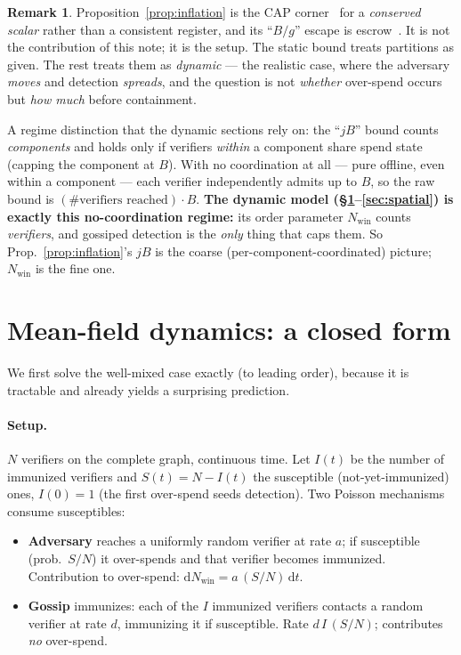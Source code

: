 \documentclass[11pt]{article}
\theoremstyle{plain}
\theoremstyle{definition}
\newtheorem{remark}{Remark}
\newcommand{\Nwin}{N_{\mathrm{win}}}
\begin{document}
\begin{remark}
Proposition~\ref{prop:inflation} is the CAP corner~\cite{GilbertLynch2002} for a
\emph{conserved scalar} rather than a consistent register, and its ``$B/g$''
escape is escrow~\cite{ONeil1986Escrow,Barbara1994Demarcation}. It is not the
contribution of this note; it is the setup. The static bound treats partitions as
given. The rest treats them as \emph{dynamic} --- the realistic case, where the
adversary \emph{moves} and detection \emph{spreads}, and the question is not
\emph{whether} over-spend occurs but \emph{how much} before containment.

A regime distinction that the dynamic sections rely on: the ``$jB$'' bound counts
\emph{components} and holds only if verifiers \emph{within} a component share spend
state (capping the component at $B$). With no coordination at all --- pure offline,
even within a component --- each verifier independently admits up to $B$, so the
raw bound is $(\#\text{verifiers reached})\cdot B$. \textbf{The dynamic model
(\S\ref{sec:meanfield}--\ref{sec:spatial}) is exactly this no-coordination regime:}
its order parameter $\Nwin$ counts \emph{verifiers}, and gossiped detection is the
\emph{only} thing that caps them. So Prop.~\ref{prop:inflation}'s $jB$ is the coarse
(per-component-coordinated) picture; $\Nwin$ is the fine one.
\end{remark}

\section{Mean-field dynamics: a closed form}\label{sec:meanfield}

We first solve the well-mixed case exactly (to leading order), because it is
tractable and already yields a surprising prediction.

\paragraph{Setup.} $N$ verifiers on the complete graph, continuous time. Let
$I(t)$ be the number of immunized verifiers and $S(t)=N-I(t)$ the susceptible
(not-yet-immunized) ones, $I(0)=1$ (the first over-spend seeds detection). Two
Poisson mechanisms consume susceptibles:
\begin{itemize}[leftmargin=1.4em,itemsep=1pt]
  \item \textbf{Adversary} reaches a uniformly random verifier at rate $a$; if
  susceptible (prob.\ $S/N$) it over-spends and that verifier becomes immunized.
  Contribution to over-spend: $\mathrm{d}\Nwin = a\,(S/N)\,\mathrm{d}t$.
  \item \textbf{Gossip} immunizes: each of the $I$ immunized verifiers contacts a
  random verifier at rate $d$, immunizing it if susceptible. Rate $d\,I\,(S/N)$;
  contributes \emph{no} over-spend.
\end{itemize}
\end{document}
